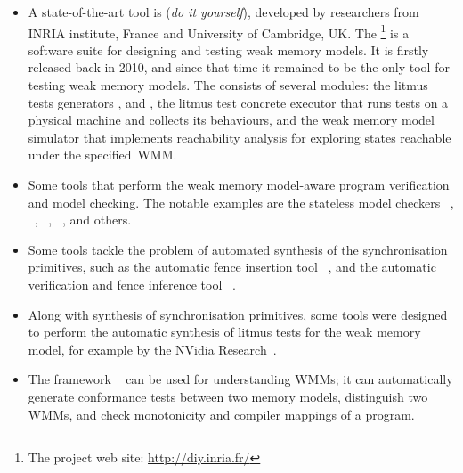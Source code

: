 \begin{itemize}[noitemsep,topsep=0pt,leftmargin=\parindent]

\item A state-of-the-art tool is  (\textit{do it yourself}), developed by researchers from INRIA institute, France and University of Cambridge, UK.
The %
%
\footnote{The  project web site: \url{http://diy.inria.fr/}} %
%
is a software suite for designing and testing weak memory models.
It is firstly released back in 2010, and since that time it remained to be the only tool for testing weak memory models.
The  consists of several modules:
the litmus tests generators ,  and ,
the litmus test concrete executor  that runs tests on a physical machine and collects its behaviours,
and the weak memory model simulator  that implements reachability analysis for exploring states reachable under the specified~WMM.

\item Some tools that perform the weak memory model-aware program verification and model checking.
The notable examples are
the stateless model checkers ~\cite{kokologiannakis2017effective}, ~\cite{musuvathi2008fair}, ~\cite{abdulla2017stateless}, ~\cite{bouajjani2013checking}, and others. 

\item Some tools tackle the problem of automated synthesis of the synchronisation primitives, such as
the automatic fence insertion tool ~\cite{alglave2014don}, and
the automatic verification and fence inference tool ~\cite{kuperstein2011partial}.

\item Along with synthesis of synchronisation primitives, some tools were designed to perform the automatic synthesis of litmus tests for the weak memory model, for example  by the NVidia Research~\cite{lustig2017automated}.

\item The framework ~\cite{wickerson2017automatically} can be used for understanding WMMs; it can automatically generate conformance tests between two memory models, distinguish two WMMs, and check monotonicity and compiler mappings of a program.


\end{itemize}
